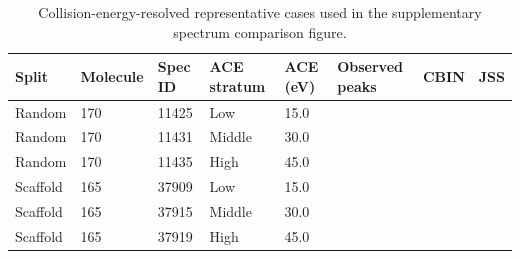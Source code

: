 \begin{table}[!t]
\centering
\caption{Collision-energy-resolved representative cases used in the supplementary spectrum comparison figure.}
\begin{tabular}{llllllll}
\toprule
Split & Molecule & Spec ID & ACE stratum & ACE (eV) & Observed peaks & CBIN & JSS \\
\midrule
Random & 170 & 11425 & Low & 15.0 &  &  &  \\
Random & 170 & 11431 & Middle & 30.0 &  &  &  \\
Random & 170 & 11435 & High & 45.0 &  &  &  \\
Scaffold & 165 & 37909 & Low & 15.0 &  &  &  \\
Scaffold & 165 & 37915 & Middle & 30.0 &  &  &  \\
Scaffold & 165 & 37919 & High & 45.0 &  &  &  \\
\bottomrule
\end{tabular}
\end{table}
